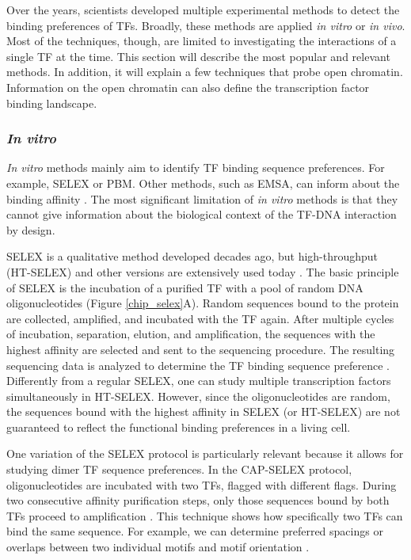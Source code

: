     Over the years, scientists developed multiple experimental methods to detect the binding preferences of TFs. Broadly, these methods are applied \textit{in vitro} or \textit{in vivo}. Most of the techniques, though, are limited to investigating the interactions of a single TF at the time. This section will describe the most popular and relevant methods. In addition, it will explain a few techniques that probe open chromatin. Information on the open chromatin can also define the transcription factor binding landscape.

      \subsubsection{\textit{In vitro}}

      \textit{In vitro} methods mainly aim to identify TF binding sequence preferences. For example, \ac{SELEX} or \ac{PBM}. Other methods, such as EMSA, can inform about the binding affinity \cite{geertz2010experimental}. The most significant limitation of \textit{in vitro} methods is that they cannot give information about the biological context of the TF-DNA interaction by design.

      SELEX is a qualitative method developed decades ago, but high-throughput (HT-SELEX) and other versions are extensively used today \cite{kinzler1990gene,jolma2010multiplexed}. The basic principle of SELEX is the incubation of a purified TF with a pool of random DNA oligonucleotides ({Figure \ref{chip_selex}}A). Random sequences bound to the protein are collected, amplified, and incubated with the TF again. After multiple cycles of incubation, separation, elution, and amplification, the sequences with the highest affinity are selected and sent to the sequencing procedure. The resulting sequencing data is analyzed to determine the TF binding sequence preference \cite{geertz2010experimental,jolma2010multiplexed}. Differently from a regular SELEX, one can study multiple transcription factors simultaneously in HT-SELEX. However, since the oligonucleotides are random, the sequences bound with the highest affinity in SELEX (or HT-SELEX) are not guaranteed to reflect the functional binding preferences in a living cell.

      One variation of the SELEX protocol is particularly relevant because it allows for studying dimer TF sequence preferences. In the \ac{CAP-SELEX} protocol, oligonucleotides are incubated with two TFs, flagged with different flags. During two consecutive affinity purification steps, only those sequences bound by both TFs proceed to amplification \cite{jolma2015dna}. This technique shows how specifically two TFs can bind the same sequence. For example, we can determine preferred spacings or overlaps between two individual motifs and motif orientation \cite{jolma2015dna}.

